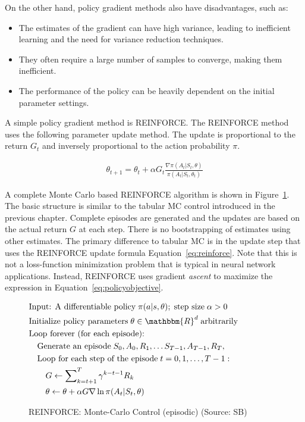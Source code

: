 On the other hand, policy gradient methods also have disadvantages, such as:
\begin{itemize}
\item The estimates of the gradient can have high variance, leading to inefficient learning and the need for variance reduction techniques.
\item They often require a large number of samples to converge, making them inefficient.
\item The performance of the policy can be heavily dependent on the initial parameter settings.
\end{itemize}

A simple policy gradient method is REINFORCE. The REINFORCE method uses the following parameter update method. The update is proportional to the return $G_t$ and inversely proportional to the action probability $\pi$. 

\begin{align}
\theta_{t+1} = \theta_t + \alpha G_t \frac{\nabla \pi(A_t | S_t, \theta)}{\pi(A_t | S_t, \theta_t)} \label{eq:reinforce}
\end{align}

A complete Monte Carlo based REINFORCE algorithm is shown in Figure~\ref{fig:reinforce}. The basic structure is similar to the tabular MC control introduced in the previous chapter. Complete episodes are generated and the updates are based on the actual return $G$ at each step. There is no bootstrapping of estimates using other estimates. The primary difference to tabular MC is in the update step that uses the REINFORCE update formula Equation~\ref{eq:reinforce}. Note that this is not a loss-function minimization problem that is typical in neural network applications. Instead, REINFORCE uses gradient \emph{ascent} to maximize the expression in Equation~\ref{eq:policyobjective}.

\begin{figure}
\small
\begin{pseudocodebox}
\vspace{-\baselineskip}
\begin{align*}
& \text{Input: A differentiable policy}\;\pi(a | s, \theta);\;\text{step size}\; \alpha > 0 \\
& \text{Initialize policy parameters}\; \theta \in \mathbbm{R}^d\;\text{arbitrarily} \\
& \text{Loop forever (for each episode):} \\
& \quad \text{Generate an episode}\; S_0, A_0, R_1, \ldots S_{T-1}, A_{T-1}, R_T, \hspace{1in} \\
& \quad \text{Loop for each step of the episode}\;t=0, 1, \ldots, T-1:\\
& \quad \quad G \leftarrow \sum\nolimits_{k=t+1}^T \gamma^{k - t - 1}R_k \\
& \quad \quad \theta \leftarrow \theta + \alpha G \nabla \ln \pi(A_t | S_t, \theta)
\end{align*}
\end{pseudocodebox}
\caption[REINFORCE: Monte-Carlso Control]{REINFORCE: Monte-Carlo Control (episodic) (Source: SB)}
\label{fig:reinforce}
\end{figure}


